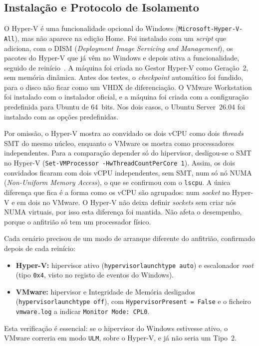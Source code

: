 \documentclass[conference]{IEEEtran}
\begin{document}
\subsection{Instalação e Protocolo de Isolamento}
O Hyper-V é uma funcionalidade opcional do Windows (\texttt{Microsoft-Hyper-V-All}), mas não aparece na edição Home. Foi instalado com um \textit{script} que adiciona, com o DISM (\textit{Deployment Image Servicing and Management}), os pacotes do Hyper-V que já vêm no Windows e depois ativa a funcionalidade, seguido de reinício~\cite{b15}. A máquina foi criada no Gestor Hyper-V como Geração~2, sem memória dinâmica. Antes dos testes, o \textit{checkpoint} automático foi fundido, para o disco não ficar como um VHDX de diferenciação. O VMware Workstation foi instalado com o instalador oficial, e a máquina foi criada com a configuração predefinida para Ubuntu de 64~bits. Nos dois casos, o Ubuntu Server~26.04 foi instalado com as opções predefinidas.

Por omissão, o Hyper-V mostra ao convidado os dois vCPU como dois \textit{threads} SMT do mesmo núcleo, enquanto o VMware os mostra como processadores independentes. Para a comparação depender só do hipervisor, desligou-se o SMT no Hyper-V (\texttt{Set-VMProcessor -HwThreadCountPerCore 1}). Assim, os dois convidados ficaram com dois vCPU independentes, sem SMT, num só nó NUMA (\textit{Non-Uniform Memory Access}), o que se confirmou com o \texttt{lscpu}. A única diferença que fica é a forma como os vCPU são agrupados: num \textit{socket} no Hyper-V e em dois no VMware. O Hyper-V não deixa definir \textit{sockets} sem criar nós NUMA virtuais, por isso esta diferença foi mantida. Não afeta o desempenho, porque o anfitrião só tem um processador físico.

Cada cenário precisou de um modo de arranque diferente do anfitrião, confirmado depois de cada reinício:
\begin{itemize}
\item \textbf{Hyper-V:} hipervisor ativo (\texttt{hypervisorlaunchtype auto}) e escalonador \textit{root} (tipo \texttt{0x4}, visto no registo de eventos do Windows).
\item \textbf{VMware:} hipervisor e Integridade de Memória desligados (\texttt{hypervisorlaunchtype off}), com \texttt{HypervisorPresent = False} e o ficheiro \texttt{vmware.log} a indicar \texttt{Monitor Mode: CPL0}.
\end{itemize}
Esta verificação é essencial: se o hipervisor do Windows estivesse ativo, o VMware correria em modo \texttt{ULM}, sobre o Hyper-V, e já não seria um Tipo~2.
\end{document}
